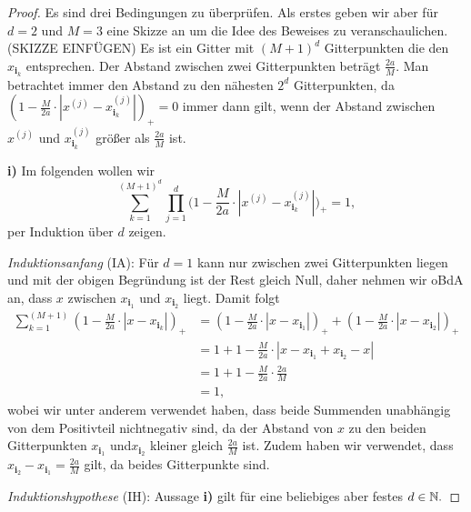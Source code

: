 \begin{proof}
Es sind drei Bedingungen zu überprüfen. Als erstes geben wir aber für $d = 2$ und $M = 3$ eine Skizze an um die Idee des Beweises zu veranschaulichen. (SKIZZE EINFÜGEN)
Es ist ein Gitter mit $(M + 1)^d$ Gitterpunkten die den $x_{\mathbf{i}_k}$ entsprechen. Der Abstand zwischen zwei Gitterpunkten beträgt $\frac{2a}{M}.$ Man betrachtet immer den Abstand zu den nähesten $2^d$ Gitterpunkten, da  $(1 - \frac{M}{2a} \cdot |x^{(j)} - x_{\mathbf{i}_k}^{(j)}|)_+ = 0$ immer dann gilt, wenn der Abstand zwischen $x^{(j)}$ und $x_{\mathbf{i}_k}^{(j)}$ größer als $\frac{2a}{M}$ ist.     

\textbf{i)} Im folgenden wollen wir $$\sum_{k = 1}^{(M + 1)^d} \prod_{j = 1}^d \bigg(1 - \frac{M}{2a} \cdot |x^{(j)} - x_{\mathbf{i}_k}^{(j)}|\bigg)_+ = 1,$$ per Induktion über $d$ zeigen. 
	
	 \emph{Induktionsanfang} (IA): Für $d = 1$ kann nur zwischen zwei Gitterpunkten liegen und mit der obigen Begründung ist der Rest gleich Null, daher nehmen wir oBdA an, dass $x$ zwischen $x_{\mathbf{i}_1}$ und $x_{\mathbf{i}_2}$ liegt. 
	Damit folgt 
	\begin{equation*}
	\begin{split}
	\sum_{k = 1}^{(M + 1)} (1 - \frac{M}{2a} \cdot |x - x_{\mathbf{i}_k}|)_+ & = (1 - \frac{M}{2a} \cdot |x - x_{\mathbf{i}_1}|)_+ + (1 - \frac{M}{2a} \cdot |x - x_{\mathbf{i}_2}|)_+ \\
	& = 1 + 1 - \frac{M}{2a} \cdot |x - x_{\mathbf{i}_1} + x_{\mathbf{i}_2} - x| \\
	& = 1 + 1 - \frac{M}{2a} \cdot \frac{2a}{M} \\
	& = 1,
	\end{split}
	\end{equation*} wobei wir unter anderem verwendet haben, dass beide Summenden unabhängig von dem Positivteil nichtnegativ sind, da der Abstand von $x$ zu den beiden Gitterpunkten $x_{\mathbf{i}_1}$ und$ x_{\mathbf{i}_2}$ kleiner gleich $\frac{2a}{M}$ ist. Zudem haben wir verwendet, dass $x_{\mathbf{i}_2} - x_{\mathbf{i}_1} = \frac{2a}{M}$ gilt, da beides Gitterpunkte sind.     
	
\emph{Induktionshypothese} (IH): Aussage \textbf{i)} gilt für eine beliebiges aber festes $d \in \mathbb{N}.$


\end{proof}
